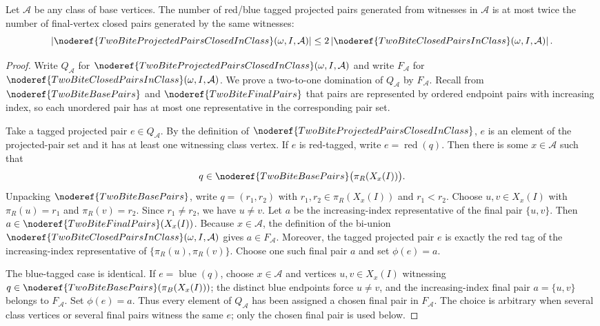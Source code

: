 \begin{lemma}
Let \(\mathcal A\) be any class of base vertices.  The number of red/blue
tagged projected pairs generated from witnesses in \(\mathcal A\) is at most
twice the number of final-vertex closed pairs generated by the same witnesses:
\[
\left|
\noderef{TwoBiteProjectedPairsClosedInClass}(\omega,I,\mathcal A)
\right|
\le
2\left|
\noderef{TwoBiteClosedPairsInClass}(\omega,I,\mathcal A)
\right|.
\]
\end{lemma}
\begin{proof}
Write \(Q_{\mathcal A}\) for
\(\noderef{TwoBiteProjectedPairsClosedInClass}(\omega,I,\mathcal A)\) and
write \(F_{\mathcal A}\) for
\(\noderef{TwoBiteClosedPairsInClass}(\omega,I,\mathcal A)\).  We prove a
two-to-one domination of \(Q_{\mathcal A}\) by \(F_{\mathcal A}\).  Recall
from \(\noderef{TwoBiteBasePairs}\) and \(\noderef{TwoBiteFinalPairs}\) that
pairs are represented by ordered endpoint pairs with increasing index, so each
unordered pair has at most one representative in the corresponding pair set.

Take a tagged projected pair \(e\in Q_{\mathcal A}\).  By the definition of
\(\noderef{TwoBiteProjectedPairsClosedInClass}\), \(e\) is an element of the
projected-pair set and it has at least one witnessing class vertex.  If \(e\)
is red-tagged, write \(e=\operatorname{red}(q)\).  Then there is some
\(x\in\mathcal A\) such that
\[
q\in
\noderef{TwoBiteBasePairs}
\bigl(\pi_R(X_x(I))\bigr).
\]
Unpacking \(\noderef{TwoBiteBasePairs}\), write \(q=(r_1,r_2)\) with
\(r_1,r_2\in\pi_R(X_x(I))\) and \(r_1<r_2\).  Choose
\(u,v\in X_x(I)\) with \(\pi_R(u)=r_1\) and \(\pi_R(v)=r_2\).  Since
\(r_1\ne r_2\), we have \(u\ne v\).  Let \(a\) be the increasing-index
representative of the final pair \(\{u,v\}\).  Then
\(a\in\noderef{TwoBiteFinalPairs}(X_x(I))\).  Because \(x\in\mathcal A\), the
definition of the bi-union
\(\noderef{TwoBiteClosedPairsInClass}(\omega,I,\mathcal A)\) gives
\(a\in F_{\mathcal A}\).  Moreover, the tagged projected pair \(e\) is exactly
the red tag of the increasing-index representative of
\(\{\pi_R(u),\pi_R(v)\}\).  Choose one such final pair \(a\) and set
\(\phi(e)=a\).

The blue-tagged case is identical.  If \(e=\operatorname{blue}(q)\), choose
\(x\in\mathcal A\) and vertices \(u,v\in X_x(I)\) witnessing
\(q\in\noderef{TwoBiteBasePairs}(\pi_B(X_x(I)))\); the distinct blue endpoints
force \(u\ne v\), and the increasing-index final pair \(a=\{u,v\}\) belongs to
\(F_{\mathcal A}\).  Set \(\phi(e)=a\).  Thus every element of
\(Q_{\mathcal A}\) has been assigned a chosen final pair in \(F_{\mathcal A}\).
The choice is arbitrary when several class vertices or several final pairs
witness the same \(e\); only the chosen final pair is used below.


\end{proof}
